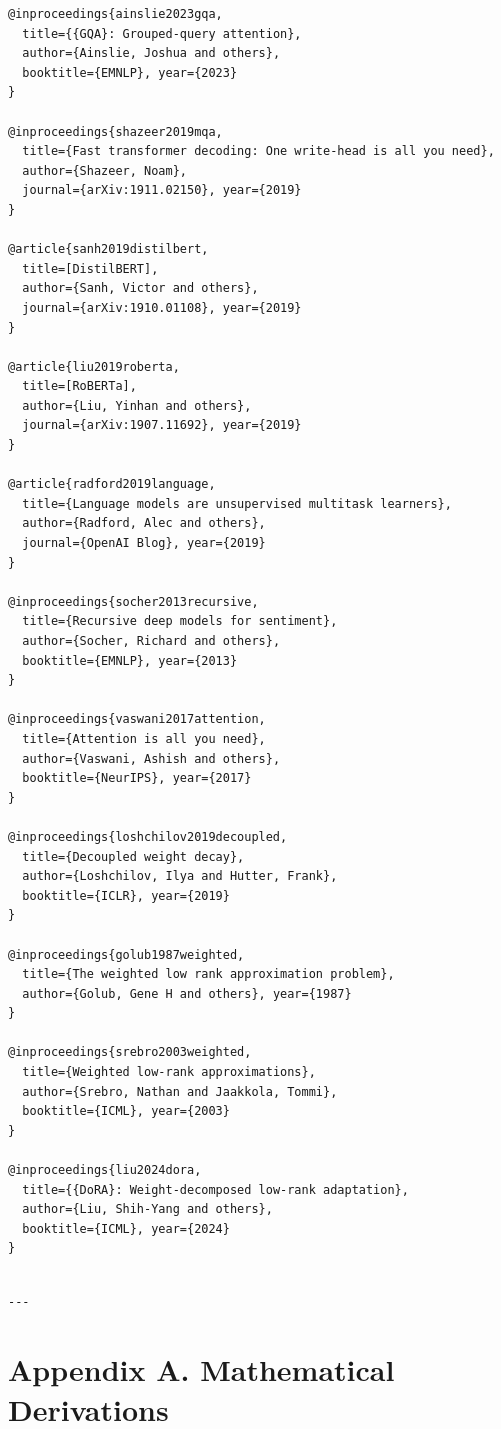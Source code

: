 \begin{lstlisting}
@inproceedings{ainslie2023gqa,
  title={{GQA}: Grouped-query attention},
  author={Ainslie, Joshua and others},
  booktitle={EMNLP}, year={2023}
}

@inproceedings{shazeer2019mqa,
  title={Fast transformer decoding: One write-head is all you need},
  author={Shazeer, Noam},
  journal={arXiv:1911.02150}, year={2019}
}

@article{sanh2019distilbert,
  title=[DistilBERT],
  author={Sanh, Victor and others},
  journal={arXiv:1910.01108}, year={2019}
}

@article{liu2019roberta,
  title=[RoBERTa],
  author={Liu, Yinhan and others},
  journal={arXiv:1907.11692}, year={2019}
}

@article{radford2019language,
  title={Language models are unsupervised multitask learners},
  author={Radford, Alec and others},
  journal={OpenAI Blog}, year={2019}
}

@inproceedings{socher2013recursive,
  title={Recursive deep models for sentiment},
  author={Socher, Richard and others},
  booktitle={EMNLP}, year={2013}
}

@inproceedings{vaswani2017attention,
  title={Attention is all you need},
  author={Vaswani, Ashish and others},
  booktitle={NeurIPS}, year={2017}
}

@inproceedings{loshchilov2019decoupled,
  title={Decoupled weight decay},
  author={Loshchilov, Ilya and Hutter, Frank},
  booktitle={ICLR}, year={2019}
}

@inproceedings{golub1987weighted,
  title={The weighted low rank approximation problem},
  author={Golub, Gene H and others}, year={1987}
}

@inproceedings{srebro2003weighted,
  title={Weighted low-rank approximations},
  author={Srebro, Nathan and Jaakkola, Tommi},
  booktitle={ICML}, year={2003}
}

@inproceedings{liu2024dora,
  title={{DoRA}: Weight-decomposed low-rank adaptation},
  author={Liu, Shih-Yang and others},
  booktitle={ICML}, year={2024}
}
\end{lstlisting}
\begin{lstlisting}

---
\end{lstlisting}


\section{Appendix A. Mathematical Derivations}

